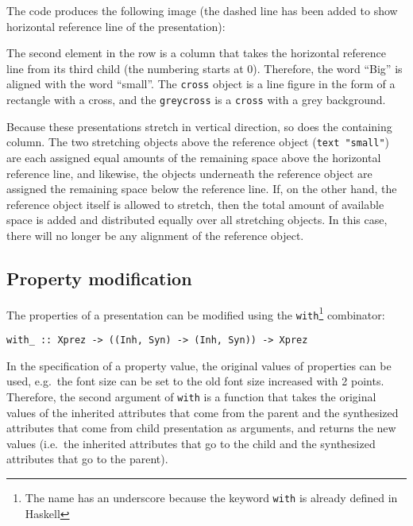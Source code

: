 \toHere
The code produces the following image (the dashed line has been added to show horizontal reference line of the presentation):

\begin{center}
\end{center}

The second element in the row is a column that takes the horizontal reference line from its third child (the numbering starts at 0). Therefore, the word ``Big'' is aligned with the word ``small''. The \texttt{cross} object is a line figure in the form of a rectangle with a cross, and the \texttt{greycross} is a \texttt{cross} with a grey background. 
 
Because these presentations stretch in vertical direction, so does the containing column. The two stretching objects above the reference object (\texttt{text "small"}) are each assigned equal amounts of the remaining space above the horizontal reference line, and likewise, the objects underneath the reference object are assigned the remaining space below the reference line. If, on the other hand, the reference object itself is allowed to stretch, then the total amount of available space is added and distributed equally over all stretching objects. In this case, there will no longer be any alignment of the reference object. 


%																
\subsection{Property modification}

The properties of a presentation can be modified using the \texttt{with}\footnote{The name has an underscore because the keyword {\tt with} is already defined in Haskell} combinator:

\begin{small}
\begin{verbatim}
with_ :: Xprez -> ((Inh, Syn) -> (Inh, Syn)) -> Xprez
\end{verbatim}
\end{small}

In the specification of a property value, the original values of properties can be used, e.g.\ the font size can be set to the old font size increased with 2 points. Therefore, the second argument of \texttt{with} is a function that takes the original values of the inherited attributes that come from the parent and the synthesized attributes that come from child presentation as arguments, and returns the new values (i.e.\ the inherited attributes that go to the child and the synthesized attributes that go to the parent).

